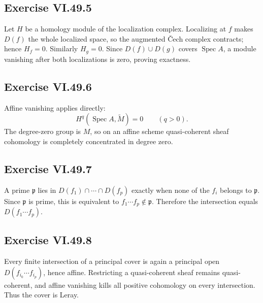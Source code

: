 \subsection*{Exercise VI.49.5}
\begin{solution}
Let \(H\) be a homology module of the localization complex.  Localizing at \(f\) makes \(D(f)\) the whole localized space, so the augmented Čech complex contracts; hence \(H_f=0\).  Similarly \(H_g=0\).  Since \(D(f)\cup D(g)\) covers \(\operatorname{Spec}A\), a module vanishing after both localizations is zero, proving exactness.
\end{solution}

\subsection*{Exercise VI.49.6}
\begin{solution}
Affine vanishing applies directly:
\[
H^q(\operatorname{Spec}A,\widetilde M)=0\qquad(q>0).
\]
The degree-zero group is \(M\), so on an affine scheme quasi-coherent sheaf cohomology is completely concentrated in degree zero.
\end{solution}

\subsection*{Exercise VI.49.7}
\begin{solution}
A prime \(\mathfrak p\) lies in \(D(f_1)\cap\cdots\cap D(f_p)\) exactly when none of the \(f_i\) belongs to \(\mathfrak p\).  Since \(\mathfrak p\) is prime, this is equivalent to \(f_1\cdots f_p\notin\mathfrak p\).  Therefore the intersection equals \(D(f_1\cdots f_p)\).
\end{solution}

\subsection*{Exercise VI.49.8}
\begin{solution}
Every finite intersection of a principal cover is again a principal open \(D(f_{i_0}\cdots f_{i_p})\), hence affine.  Restricting a quasi-coherent sheaf remains quasi-coherent, and affine vanishing kills all positive cohomology on every intersection.  Thus the cover is Leray.
\end{solution}

